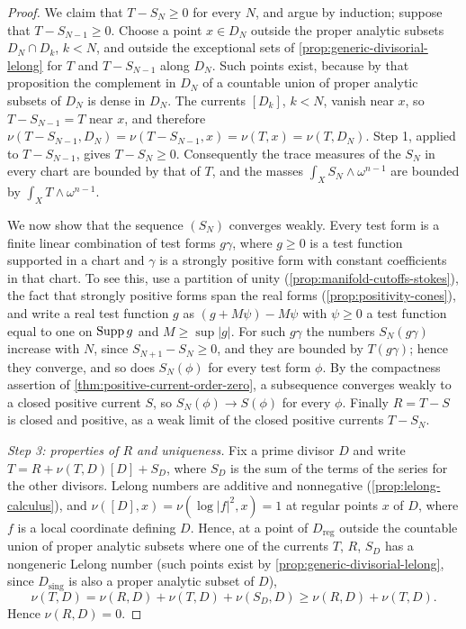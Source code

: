 \begin{proof}
We claim that $T-S_N\geq0$ for every $N$, and argue by induction; suppose that $T-S_{N-1}\geq0$. Choose a point $x\in D_N$ outside the proper analytic subsets $D_N\cap D_k$, $k<N$, and outside the exceptional sets of \cref{prop:generic-divisorial-lelong} for $T$ and $T-S_{N-1}$ along $D_N$. Such points exist, because by that proposition the complement in $D_N$ of a countable union of proper analytic subsets of $D_N$ is dense in $D_N$. The currents $[D_k]$, $k<N$, vanish near $x$, so $T-S_{N-1}=T$ near $x$, and therefore $\nu(T-S_{N-1},D_N)=\nu(T-S_{N-1},x)=\nu(T,x)=\nu(T,D_N)$. Step 1, applied to $T-S_{N-1}$, gives $T-S_N\geq0$. Consequently the trace measures of the $S_N$ in every chart are bounded by that of $T$, and the masses $\int_XS_N\wedge\omega^{n-1}$ are bounded by $\int_XT\wedge\omega^{n-1}$.

We now show that the sequence $(S_N)$ converges weakly. Every test form is a finite linear combination of test forms $g\gamma$, where $g\geq0$ is a test function supported in a chart and $\gamma$ is a strongly positive form with constant coefficients in that chart. To see this, use a partition of unity (\cref{prop:manifold-cutoffs-stokes}), the fact that strongly positive forms span the real forms (\cref{prop:positivity-cones}), and write a real test function $g$ as $(g+M\psi)-M\psi$ with $\psi\geq0$ a test function equal to one on $\operatorname{Supp} g$ and $M\geq\sup|g|$. For such $g\gamma$ the numbers $S_N(g\gamma)$ increase with $N$, since $S_{N+1}-S_N\geq0$, and they are bounded by $T(g\gamma)$; hence they converge, and so does $S_N(\phi)$ for every test form $\phi$. By the compactness assertion of \cref{thm:positive-current-order-zero}, a subsequence converges weakly to a closed positive current $S$, so $S_N(\phi)\to S(\phi)$ for every $\phi$. Finally $R=T-S$ is closed and positive, as a weak limit of the closed positive currents $T-S_N$.

\emph{Step 3: properties of $R$ and uniqueness.} Fix a prime divisor $D$ and write $T=R+\nu(T,D)[D]+S_D$, where $S_D$ is the sum of the terms of the series for the other divisors. Lelong numbers are additive and nonnegative (\cref{prop:lelong-calculus}), and $\nu([D],x)=\nu(\log|f|^2,x)=1$ at regular points $x$ of $D$, where $f$ is a local coordinate defining $D$. Hence, at a point of $D_{\mathrm{reg}}$ outside the countable union of proper analytic subsets where one of the currents $T$, $R$, $S_D$ has a nongeneric Lelong number (such points exist by \cref{prop:generic-divisorial-lelong}, since $D_{\mathrm{sing}}$ is also a proper analytic subset of $D$),
\[
 \nu(T,D)=\nu(R,D)+\nu(T,D)+\nu(S_D,D)\geq\nu(R,D)+\nu(T,D).
\]
Hence $\nu(R,D)=0$.


\end{proof}
